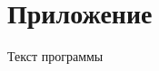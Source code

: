 \documentclass[14pt, oneside]{altsu-report}
\begin{document}
\appendix
\newpage
\chapter*{\raggedleft\label{appendix1}Приложение}

\begin{center}
\label{code:appendix}Текст программы
\end{center}

\begin{code}
\vspace{-1cm}\inputminted{py}{src/code.py}
\end{code}
\end{document}
